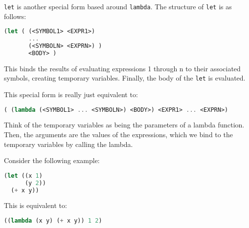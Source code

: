 \texttt{let} is another special form based around \texttt{lambda}. The structure
of \texttt{let} is as follows:

\begin{lstlisting}[language=Scheme]
(let ( (<SYMBOL1> <EXPR1>)
       ...
       (<SYMBOLN> <EXPRN>) )
       <BODY> )
\end{lstlisting}

This binds the results of evaluating expressions 1 through n to their associated
symbols, creating temporary variables. Finally, the body of the \texttt{let} is
evaluated.

This special form is really just equivalent to:

\begin{lstlisting}[language=Scheme]
( (lambda (<SYMBOL1> ... <SYMBOLN>) <BODY>) <EXPR1> ... <EXPRN>)
\end{lstlisting}

Think of the temporary variables as being the parameters of a lambda function.
Then, the arguments are the values of the expressions, which we bind to the
temporary variables by calling the lambda.

Consider the following example:
\begin{lstlisting}[language=Scheme]
(let ((x 1)
      (y 2))
  (+ x y))
\end{lstlisting}
This is equivalent to:
\begin{lstlisting}[language=Scheme]
((lambda (x y) (+ x y)) 1 2)
\end{lstlisting}
